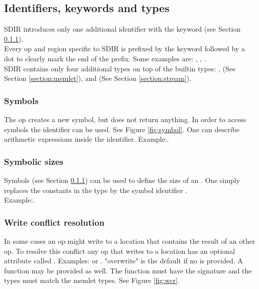 \subsection{Identifiers, keywords and types}
SDIR introduces only one additional identifier with the keyword  (see Section \ref{section:symbol}).\\
Every op and region specific to SDIR is prefixed by the keyword  followed by a dot to clearly mark the end of the prefix. Some examples are: , , . \\
SDIR contains only four additional types on top of the builtin types: ,  (See Section \ref{section:memlet}),  and  (See Section \ref{section:stream}).

\subsubsection{Symbols} \label{section:symbol}
The op  creates a new symbol, but does not return anything. In order to access symbols the identifier  can be used. See Figure \ref{fig:symbol}. One can describe arithmetic expressions inside the identifier. Example:.

 \subsubsection{Symbolic sizes}
 Symbols (see Section \ref{section:symbol}) can be used to define the size of an . One simply replaces the constants in the type by the symbol identifier .\\
 Example:.
 
 \subsubsection{Write conflict resolution}
In some cases an op might write to a location that contains the result of an other op. To resolve this conflict any op that writes to a location has an optional attribute called . Examples: or . "overwrite" is the default if no  is provided. A function may be provided as well. The function must have the signature  and the types must match the memlet types. See Figure \ref{fig:wcr}.

